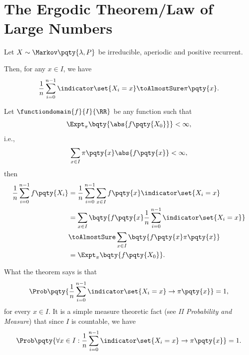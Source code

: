 \section{The Ergodic Theorem/Law of Large Numbers}

\begin{theorem}
    Let \(X \sim \Markov\pqty{\lambda, P}\) be irreducible, aperiodic and positive recurrent.

    Then, for any \(x \in I\), we have
    \[
        \frac{1}{n} \sum_{i = 0}^{n - 1} \indicator \set{X_i = x} \toAlmostSure \pi\pqty{x}.
    \]
\end{theorem}

Let \(\functiondomain{f}{I}{\RR}\) be any function such that
\[
    \Expt_{\pi} \bqty{\abs{f\pqty{X_0}}} < \infty,
\]
i.e.,
\[
    \sum_{x \in I} \pi\pqty{x} \abs{f\pqty{x}} < \infty,
\]
then
\begin{align*}
    \frac{1}{n} \sum_{i = 0}^{n - 1} f\pqty{X_i} &= \frac{1}{n} \sum_{i = 0}^{n - 1} \sum_{x \in I} f\pqty{x} \indicator \set{X_i = x} \\
    &= \sum_{x \in I} \bqty{f\pqty{x} \frac{1}{n} \sum_{i = 0}^{n - 1} \indicator \set{X_i = x}} \\
    &\toAlmostSure \sum_{x \in I} \bqty{f\pqty{x} \pi\pqty{x}} \\
    &= \Expt_{\pi} \bqty{f\pqty{X_0}}.
\end{align*}

\small

\begin{remark}
    What the theorem says is that
    \[
        \Prob\pqty{\frac{1}{n} \sum_{i = 0}^{n - 1} \indicator \set{X_i = x} \to \pi\pqty{x}} = 1,
    \]
    for every \(x \in I\). It is a simple measure theoretic fact (see \textit{II Probability and Measure}) that since \(I\) is countable, we have
    \[
        \Prob\pqty{\forall x \in I: \frac{1}{n} \sum_{i = 0}^{n - 1} \indicator \set{X_i = x} \to \pi\pqty{x}} = 1.
    \]
\end{remark}

